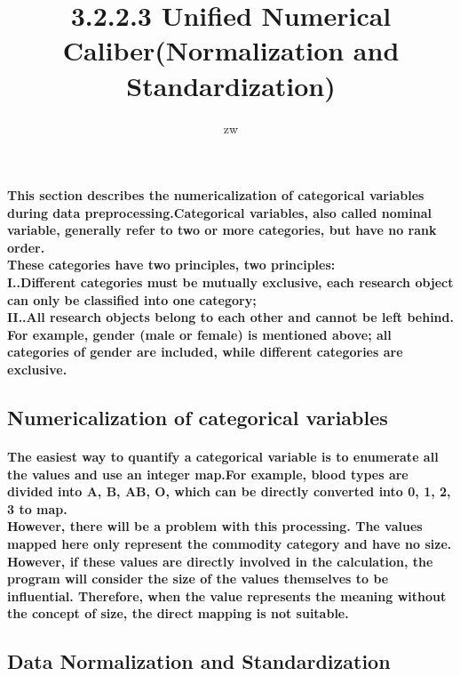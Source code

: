 \documentclass{article}
\date{}
\author{zw}
\begin{document}
\maketitle
\title{\huge3.2.2.3 Unified Numerical Caliber(Normalization and Standardization)}

\paragraph{This section describes the numericalization of categorical variables during data preprocessing.Categorical variables, also called nominal variable, generally refer to two or more categories, but have no rank order.
\\ These categories have two principles, two principles: \\ I..Different categories must be mutually exclusive, each research object can only be classified into one category;\\II..All research objects belong to each other and cannot be left behind. For example, gender (male or female) is mentioned above; all categories of gender are included, while different categories are exclusive.}

\subsection{Numericalization of categorical variables}
\paragraph{The easiest way to quantify a categorical variable is to enumerate all the values and use an integer map.For example, blood types are divided into A, B, AB, O, which can be directly converted into 0, 1, 2, 3 to map.\\However, there will be a problem with this processing. The values ​​mapped here only represent the commodity category and have no size. However, if these values ​​are directly involved in the calculation, the program will consider the size of the values ​​themselves to be influential. Therefore, when the value represents the meaning without the concept of size, the direct mapping is not suitable.}

\subsection{Data Normalization and Standardization}
\end{document}
